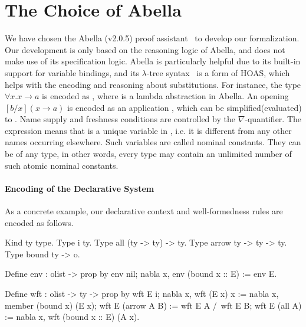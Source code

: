 \section{The Choice of Abella}

We have chosen the Abella (v2.0.5) proof assistant~\citep{AbellaDesc} to
develop our formalization.
Our development is only based on the reasoning logic of Abella, and does not make use of its specification logic.
Abella is particularly helpful due to its built-in support for variable bindings, and
its $\lambda$-tree syntax~\citep{miller2000abstract} is a form of HOAS,
which helps with the encoding and reasoning about substitutions.  For
instance, the type $\forall x. x \to a$ is encoded as , where  is a lambda abstraction in
Abella. An opening $[b/x](x\to a)$ is encoded as an application
, which can be simplified(evaluated) to
.
Name supply and freshness conditions are controlled by the
$\nabla$-quantifier.  The expression  means that
 is a unique variable in , i.e. it is different
from any other names occurring elsewhere.  Such variables are called
nominal constants.  They can be of any type, in other words, every
type may contain an unlimited number of such atomic nominal constants.


\paragraph{Encoding of the Declarative System}
As a concrete example, our declarative context and well-formedness rules are encoded as follows.
\begin{abella}
	Kind ty     type.
	Type i      ty.                %
	Type all    (ty -> ty) -> ty.    %
	Type arrow  ty -> ty -> ty.      %
	Type bound  ty -> o.            %
	
	Define env : olist -> prop by
		env nil;
		nabla x, env (bound x :: E) := env E.
	
	Define wft : olist -> ty -> prop by
		wft E i;
		nabla x, wft (E x) x := nabla x, member (bound x) (E x);
		wft E (arrow A B) := wft E A /\ wft E B;
		wft E (all A) := nabla x, wft (bound x :: E) (A x).
\end{abella}

